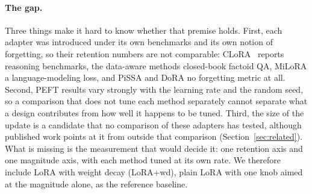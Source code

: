 \documentclass[11pt]{article}
\begin{document}
\paragraph{The gap.} Three things make it hard to know whether that premise
holds. First, each adapter was introduced under its own benchmarks and its own
notion of forgetting, so their retention numbers are not comparable:
CLoRA~\citep{clora} reports reasoning benchmarks, the data-aware methods
closed-book factoid QA, MiLoRA a language-modeling loss, and PiSSA and DoRA no
forgetting metric at all. Second, PEFT results vary strongly with the learning
rate and the random seed, so a comparison that does not tune each method
separately cannot separate what a design contributes from how well it happens
to be tuned. Third, the size of the update is a candidate that no comparison of
these adapters has tested, although published work points at it from outside
that comparison (Section~\ref{sec:related}). What is missing is the
measurement that would decide it: one retention axis and one magnitude axis,
with each method tuned at its own rate. We therefore include LoRA with weight
decay (LoRA{+}wd), plain LoRA with one knob aimed at the magnitude alone,
as the reference baseline.
\end{document}
